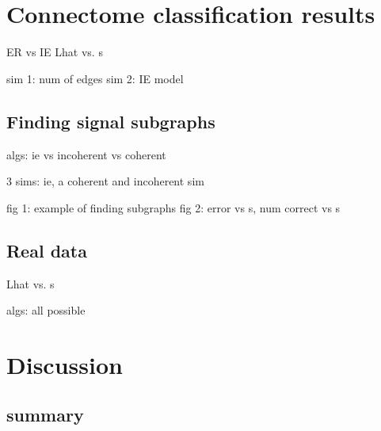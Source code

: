 \section{Connectome classification results} %
\label{sub:connectome_classification_results}












ER vs IE
Lhat vs. s

sim 1: num of edges
sim 2: IE model



\subsection{Finding signal subgraphs} %
\label{sub:finding_signal_subgraphs}

algs: ie vs incoherent vs coherent

3 sims: ie, a coherent and incoherent sim

fig 1: example of finding subgraphs
fig 2: error vs s, num correct vs s






\subsection{Real data} %
\label{sub:real_data}


Lhat vs. s

algs: all possible




\section{Discussion} %
\label{sec:discussion}


\subsection{summary} %
\label{sub:summary}

